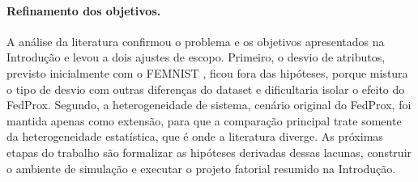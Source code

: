 \paragraph{Refinamento dos objetivos.} A análise da literatura confirmou o problema e os objetivos apresentados na Introdução e levou a dois ajustes de escopo. Primeiro, o desvio de atributos, previsto inicialmente com o FEMNIST \citep{caldas2018leaf}, ficou fora das hipóteses, porque mistura o tipo de desvio com outras diferenças do dataset e dificultaria isolar o efeito do FedProx. Segundo, a heterogeneidade de sistema, cenário original do FedProx, foi mantida apenas como extensão, para que a comparação principal trate somente da heterogeneidade estatística, que é onde a literatura diverge. As próximas etapas do trabalho são formalizar as hipóteses derivadas dessas lacunas, construir o ambiente de simulação e executar o projeto fatorial resumido na Introdução.
